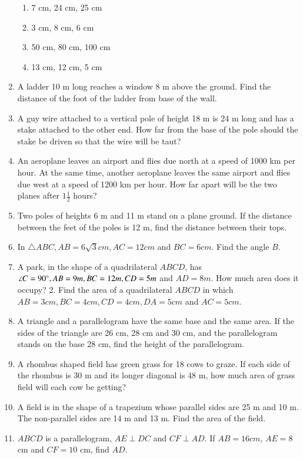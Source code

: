 \begin{enumerate}[label=\arabic*.,ref=\thesubsection.\theenumi]
\begin{enumerate}
\item  7 cm, 24 cm, 25 cm 
\item  3 cm, 8 cm, 6 cm 
\item  50 cm, 80 cm, 100 cm 
\item  13 cm, 12 cm, 5 cm
\end{enumerate}
\item  A ladder 10 m long reaches a window 8 m above the ground. Find the distance of the foot of the ladder from base of the wall.
\item  A guy wire attached to a vertical pole of height 18 m is 24 m long and has a stake attached to the other end. How far from the base of the pole should the stake be driven so that the wire will be taut?
\item  An aeroplane leaves an airport and flies due north at a speed of 1000 km per hour. At the same time, another aeroplane leaves the same airport and flies due west at a speed of 1200 km per hour. How far apart will be the two planes after $1\frac{1}{2}$ hours?
\item  Two poles of heights 6 m and 11 m stand on a plane ground. If the distance between the feet of the poles is 12 m, find the distance between their tops.
\item  In  $\triangle  ABC, AB = 6\sqrt{3} cm, AC = 12 cm$ and $BC = 6 cm$. Find the angle $B$.
%
\item A park, in the shape of a quadrilateral $ABCD$, has $\angle C = 90\degree, AB = 9 m, BC = 12 m, CD = 5 m$ and $ AD = 8 m$. How much area does it occupy?
2. Find the area of a quadrilateral $ABCD$ in which $AB = 3 cm, BC = 4 cm, CD = 4 cm, DA = 5 cm$ and $AC = 5 cm$.
\item A triangle and a parallelogram have the same base and the same area. If the sides of the triangle are 26 cm, 28 cm and 30 cm, and the parallelogram stands on the base 28 cm, find the height of the parallelogram.
\item A rhombus shaped field has green grass for 18 cows to graze. If each side of the rhombus is 30 m and its longer diagonal is 48 m, how much area of grass field will each cow be getting?
\item A field is in the shape of a trapezium whose parallel sides are 25 m and 10 m. The non-parallel sides are 14 m and 13 m. Find the area of the field.
%
\item $ABCD$ is a parallelogram, $AE  \perp  DC$ and $CF  \perp  AD$. If $AB = 16 cm$, $AE = 8$ cm and $CF = 10$ cm, find $AD$.

\end{enumerate}
